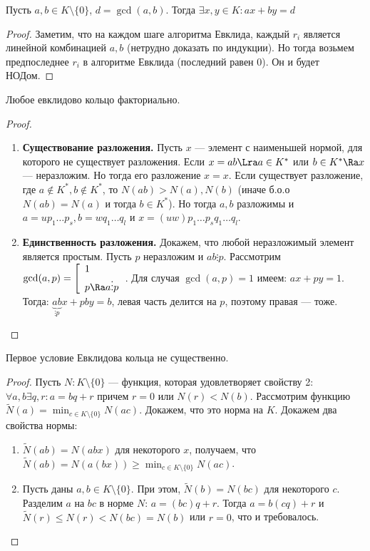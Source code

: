 \begin{lemma}
    Пусть \(a, b \in K \setminus \{0\}\), \(d = \gcd(a, b)\). Тогда \(\exists x, y \in K: ax + by = d\)
\end{lemma}
\begin{proof}
    Заметим, что на каждом шаге алгоритма Евклида, каждый \(r_i\) является линейной комбинацией \(a, b\) (нетрудно доказать по индукции). Но тогда возьмем предпоследнее \(r_i\) в алгоритме Евклида (последний равен 0). Он и будет НОДом.
\end{proof}

\begin{theorem}
    Любое евклидово кольцо факториально.
\end{theorem}
\begin{proof}
    \begin{enumerate}
        \item \textbf{Существование разложения.} Пусть \(x\) --- элемент с наименьшей нормой, для которого не существует разложения. Если \(x = ab \Lra a \in K^*\) или \(b \in K^* \Ra x\) --- неразложим. Но тогда его разложение \(x = x\). Если существует разложение, где \(a \notin K^*, b \notin K^*\), то \(N(ab) > N(a), N(b)\) (иначе б.о.о \(N(ab) = N(a)\) и тогда \(b \in K^*\)). Но тогда \(a, b\) разложимы и \(a = up_1\dots p_s, b = wq_1\dots q_l\) и \(x = (uw)p_1\dots p_s q_1\dots q_l\).
        \item \textbf{Единственность разложения.} Докажем, что любой неразложимый элемент является простым. Пусть \(p\) неразложим и \(ab \vdots p\). Рассмотрим \(\gcd(a, p) = \left[\begin{array}{l}
            1 \\
            p \Ra a \vdots p
        \end{array}\right.\). Для случая \(\gcd(a, p) = 1\) имеем: \(ax + py = 1\). Тогда: \(\underbrace{ab}_{\vdots p}x + pby = b\), левая часть делится на \(p\), поэтому правая --- тоже.
    \end{enumerate}
\end{proof}

\begin{proposition}
    Первое условие Евклидова кольца не существенно.
\end{proposition}
\begin{proof}
    Пусть \(N: K \setminus \{0\}\) --- функция, которая удовлетворяет свойству 2: \(\forall a, b \exists q, r: a = bq + r\) причем \(r = 0\) или \(N(r) < N(b)\). Рассмотрим функцию \(\tilde{N}(a) = \min_{c \in K\setminus\{0\}} N(ac)\). Докажем, что это норма на \(K\). Докажем два свойства нормы:
    \begin{enumerate}
        \item \(\tilde{N}(ab) = N(abx)\) для некоторого \(x\), получаем, что \(\tilde{N}(ab) = N(a(bx)) \ge \min_{c \in K\setminus\{0\}} N(ac)\).
        \item Пусть даны \(a, b \in K \setminus \{0\}\). При этом, \(\tilde{N}(b) = N(bc)\) для некоторого \(c\). Разделим \(a\) на \(bc\) в норме \(N\): \(a = (bc)q + r\). Тогда \(a = b(cq) + r\) и \(\tilde{N}(r) \le N(r) < N(bc) = N(b)\) или \(r = 0\), что и требовалось.
    \end{enumerate}
\end{proof}


